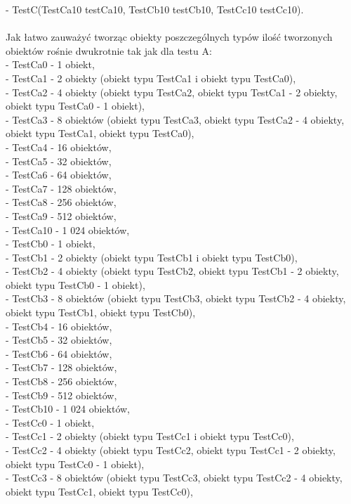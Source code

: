 \documentclass[12pt]{article}
\begin{document}
- TestC(TestCa10 testCa10, TestCb10 testCb10, TestCc10 testCc10).\\
\\
Jak łatwo zauważyć tworząc obiekty poszczególnych typów ilość tworzonych obiektów rośnie dwukrotnie tak jak dla testu A:\\
- TestCa0 - 1 obiekt,\\
- TestCa1 - 2 obiekty (obiekt typu TestCa1 i obiekt typu TestCa0),\\
- TestCa2 - 4 obiekty (obiekt typu TestCa2, obiekt typu TestCa1 - 2 obiekty, obiekt typu TestCa0 - 1 obiekt),\\
- TestCa3 - 8 obiektów (obiekt typu TestCa3, obiekt typu TestCa2 - 4 obiekty, obiekt typu TestCa1, obiekt typu TestCa0),\\
- TestCa4 - 16 obiektów,\\
- TestCa5 - 32 obiektów,\\
- TestCa6 - 64 obiektów,\\
- TestCa7 - 128 obiektów,\\
- TestCa8 - 256 obiektów,\\
- TestCa9 - 512 obiektów,\\
- TestCa10 - 1 024 obiektów,\\
- TestCb0 - 1 obiekt,\\
- TestCb1 - 2 obiekty (obiekt typu TestCb1 i obiekt typu TestCb0),\\
- TestCb2 - 4 obiekty (obiekt typu TestCb2, obiekt typu TestCb1 - 2 obiekty, obiekt typu TestCb0 - 1 obiekt),\\
- TestCb3 - 8 obiektów (obiekt typu TestCb3, obiekt typu TestCb2 - 4 obiekty, obiekt typu TestCb1, obiekt typu TestCb0),\\
- TestCb4 - 16 obiektów,\\
- TestCb5 - 32 obiektów,\\
- TestCb6 - 64 obiektów,\\
- TestCb7 - 128 obiektów,\\
- TestCb8 - 256 obiektów,\\
- TestCb9 - 512 obiektów,\\
- TestCb10 - 1 024 obiektów,\\
- TestCc0 - 1 obiekt,\\
- TestCc1 - 2 obiekty (obiekt typu TestCc1 i obiekt typu TestCc0),\\
- TestCc2 - 4 obiekty (obiekt typu TestCc2, obiekt typu TestCc1 - 2 obiekty, obiekt typu TestCc0 - 1 obiekt),\\
- TestCc3 - 8 obiektów (obiekt typu TestCc3, obiekt typu TestCc2 - 4 obiekty, obiekt typu TestCc1, obiekt typu TestCc0),\\
\end{document}

